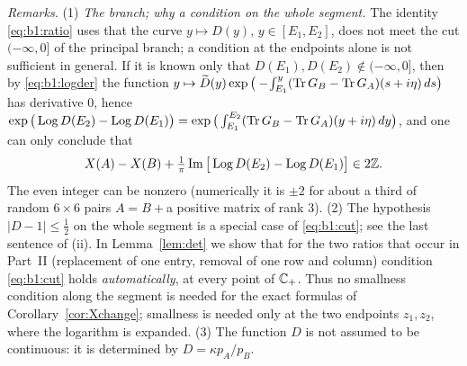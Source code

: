 \noindent\emph{Remarks.} (1) \emph{The branch; why a condition on the whole segment.} The identity \eqref{eq:b1:ratio} uses that the curve
$y\mapsto D(y)$, $y\in[E_1,E_2]$, does not meet the cut $(-\infty,0]$ of the principal branch; a condition at the endpoints alone is not
sufficient in general. If it is known only that $D(E_1),D(E_2)\notin(-\infty,0]$, then by \eqref{eq:b1:logder} the function
$y\mapsto\widetilde D(y)\exp\big(-\!\int_{E_1}^y(\operatorname{Tr} G_B-\operatorname{Tr} G_A)(s+i\eta)\,ds\big)$ has derivative $0$, hence
$\exp\big(\operatorname{Log} D(E_2)-\operatorname{Log} D(E_1)\big)=\exp\big(\int_{E_1}^{E_2}(\operatorname{Tr} G_B-\operatorname{Tr} G_A)(y+i\eta)\,dy\big)$, and one can only conclude that
\[
X(A)-X(B)+\tfrac1\pi\operatorname{Im}\big[\operatorname{Log} D(E_2)-\operatorname{Log} D(E_1)\big]\in2\mathbb Z .
\]
The even integer can be nonzero (numerically it is $\pm2$ for about a third of random $6\times6$ pairs $A=B+{}$a positive matrix of rank $3$).
(2) The hypothesis $|D-1|\le\frac12$ on the whole segment is a special case of \eqref{eq:b1:cut}; see the last sentence of (ii).
In Lemma~\ref{lem:det} we show that for the two ratios that occur in Part~II (replacement of one entry, removal of one row and column)
condition \eqref{eq:b1:cut} holds \emph{automatically}, at every point of $\mathbb{C}_+$. Thus no smallness condition along the segment is needed for the
exact formulas of Corollary~\ref{cor:Xchange}; smallness is needed only at the two endpoints $z_1,z_2$, where the logarithm is expanded.
(3) The function $D$ is not assumed to be continuous: it is determined by $D=\kappa p_A/p_B$.

